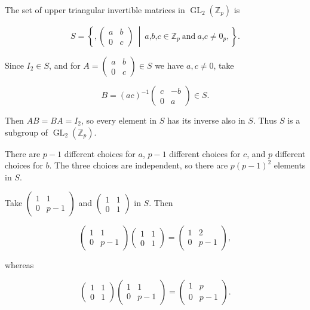 The set of upper triangular invertible matrices in \(\operatorname{GL}_{2}\left( \mathbb{Z}_{p} \right)\) is

\[S = \left\{ ,\begin{pmatrix}
a & b \\
0 & c
\end{pmatrix}\  \middle| \ a\text{,}b\text{,}c \in \mathbb{Z}_{p}\ \text{and}\ a\text{,}c \neq 0_{p}, \right\}.\]

Since \(I_{2} \in S\), and for \(A = \begin{pmatrix}
a & b \\
0 & c
\end{pmatrix} \in S\) we have \(a,c \neq 0\), take

\[B = \left( {ac} \right)^{- 1}\begin{pmatrix}
c & {- b} \\
0 & a
\end{pmatrix} \in S.\]

Then \(AB = BA = I_{2}\), so every element in \(S\) has its inverse also in \(S\). Thus \(S\) is a subgroup of \(\operatorname{GL}_{2}\left( \mathbb{Z}_{p} \right)\).

There are \(p - 1\) different choices for \(a\), \(p - 1\) different choices for \(c\), and \(p\) different choices for \(b\). The three choices are independent, so there are \({p\left( {p - 1} \right)}^{2}\) elements in \(S\).

Take \(\begin{pmatrix}
1 & 1 \\
0 & {p - 1}
\end{pmatrix}\) and \(\begin{pmatrix}
1 & 1 \\
0 & 1
\end{pmatrix}\) in \(S\). Then

\[\begin{pmatrix}
1 & 1 \\
0 & {p - 1}
\end{pmatrix}\begin{pmatrix}
1 & 1 \\
0 & 1
\end{pmatrix} = \begin{pmatrix}
1 & 2 \\
0 & {p - 1}
\end{pmatrix},\]

whereas

\[\begin{pmatrix}
1 & 1 \\
0 & 1
\end{pmatrix}\begin{pmatrix}
1 & 1 \\
0 & {p - 1}
\end{pmatrix} = \begin{pmatrix}
1 & p \\
0 & {p - 1}
\end{pmatrix}.\]

